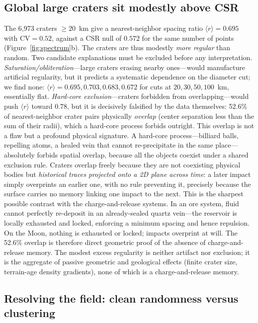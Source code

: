 \documentclass[12pt,a4paper]{article}
\begin{document}
\subsection{Global large craters sit modestly above CSR}

The 6{,}973 craters $\geq20$~km give a nearest-neighbor spacing ratio $\langle r\rangle=0.695$ with $\mathrm{CV}=0.52$, against a CSR null of $0.572$ for the same number of points (Figure~\ref{fig:spectrum}b). The craters are thus modestly \emph{more regular} than random. Two candidate explanations must be excluded before any interpretation. \emph{Saturation/obliteration}---large craters erasing nearby ones---would manufacture artificial regularity, but it predicts a systematic dependence on the diameter cut; we find none: $\langle r\rangle=0.695,0.703,0.683,0.672$ for cuts at $20,30,50,100$~km, essentially flat. \emph{Hard-core exclusion}---craters forbidden from overlapping---would push $\langle r\rangle$ toward $0.78$, but it is decisively falsified by the data themselves: 52.6\% of nearest-neighbor crater pairs physically \emph{overlap} (center separation less than the sum of their radii), which a hard-core process forbids outright. This overlap is not a flaw but a profound physical signature. A hard-core process---billiard balls, repelling atoms, a healed vein that cannot re-precipitate in the same place---absolutely forbids spatial overlap, because all the objects coexist under a shared exclusion rule. Craters overlap freely because they are not coexisting physical bodies but \emph{historical traces projected onto a 2D plane across time}: a later impact simply overprints an earlier one, with no rule preventing it, precisely because the surface carries no memory linking one impact to the next. This is the sharpest possible contrast with the charge-and-release systems. In an ore system, fluid cannot perfectly re-deposit in an already-sealed quartz vein---the reservoir is locally exhausted and locked, enforcing a minimum spacing and hence repulsion. On the Moon, nothing is exhausted or locked; impacts overprint at will. The 52.6\% overlap is therefore direct geometric proof of the absence of charge-and-release memory. The modest excess regularity is neither artifact nor exclusion; it is the aggregate of passive geometric and geological effects (finite crater size, terrain-age density gradients), none of which is a charge-and-release memory.

\subsection{Resolving the field: clean randomness versus clustering}
\end{document}

